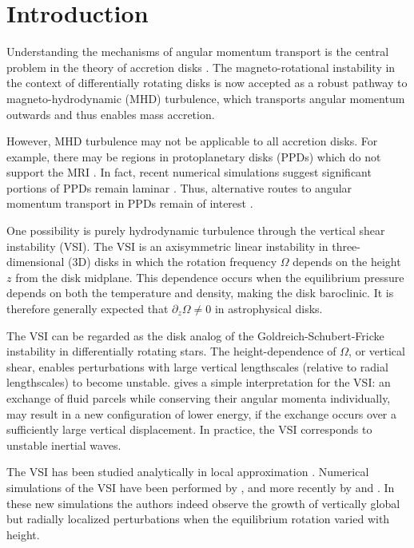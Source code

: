 \documentclass[iop]{emulateapj}
\newcommand{\p}{\partial}
\begin{document}
\section{Introduction}
Understanding the mechanisms of angular momentum transport is the
central problem in the theory of accretion disks 
\citep{lyndenbell74}. The   
magneto-rotational instability in the context of differentially
rotating disks \citep[MRI,][]{balbus91} is now accepted as a robust
pathway to magneto-hydrodynamic (MHD) turbulence, which transports
angular momentum outwards and thus enables mass accretion. 

However, MHD turbulence may not be applicable to all  
accretion disks. For example, there may be regions in protoplanetary  
disks (PPDs) which do not support the MRI 
\citep{gammie96,landry13}. In fact, recent  numerical simulations
suggest significant portions of PPDs remain laminar \citep[e.g.][and references
therein]{lesur14,bai15,gressel15}. Thus, alternative routes 
to angular momentum transport in PPDs remain of interest
\citep{armitage10}. 
 
One possibility is purely hydrodynamic turbulence through the vertical
shear instability (VSI). The VSI is an axisymmetric linear instability
in three-dimensional (3D) disks in which the rotation frequency
$\Omega$ depends on the height $z$ from the disk midplane. This
dependence occurs when the equilibrium pressure depends on both the
temperature and density, making the disk baroclinic. It is therefore
generally expected that $\p_z\Omega\neq 0$ in astrophysical disks.  

The VSI can be regarded as the disk analog of the
Goldreich-Schubert-Fricke instability 
\citep[GSF,][]{goldreich67,fricke68} in differentially rotating stars.   
The height-dependence of $\Omega$, or vertical shear, enables
perturbations with large vertical lengthscales (relative to radial 
lengthscales) to become unstable. \cite{umurhan13} gives a simple
interpretation for the VSI: an exchange of fluid parcels while
conserving their angular momenta individually, may result in a new
configuration of lower energy, if the exchange occurs over a
sufficiently large vertical displacement. In practice, the VSI
corresponds to unstable inertial waves.  

The VSI has been studied analytically in local approximation
\citep{urpin98,urpin03}.  Numerical simulations of the  
VSI have been performed by \cite{arlt04}, and more recently by 
\cite{nelson13} and \cite{stoll14}. In these new simulations the authors
indeed observe the growth of vertically global but radially localized
perturbations when the equilibrium rotation varied with height.   
\end{document}

